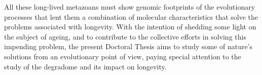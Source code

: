 \bigskip
\bigskip
\bigskip
All these long-lived metazoans must show genomic footprints of the evolutionary processes that lent them a combination of molecular characteristics that solve the problems associated with longevity.
With the intention of shedding some light on the subject of ageing, and to contribute to the collective efforts in solving this impending problem, the present Doctoral Thesis aims to study some of nature's solutions from an evolutionary point of view, paying special attention to the study of the degradome and its impact on longevity.

\vspace*{\fill}
